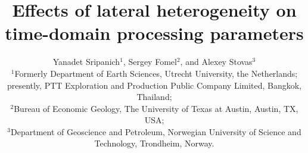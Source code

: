 
\title{Effects of lateral heterogeneity on time-domain processing parameters}

\author{Yanadet Sripanich$^{1}$, Sergey Fomel$^{2}$, and Alexey Stovas$^{3}$ \\
$^1$Formerly Department of Earth Sciences, Utrecht University, the Netherlands; presently, PTT Exploration and Production Public Company Limited, Bangkok, Thailand; \\
$^2$Bureau of Economic Geology, The University of Texas at Austin, Austin, TX, USA; \\
$^3$Department of Geoscience and Petroleum, Norwegian University of Science and Technology, Trondheim, Norway.}

\maketitle


